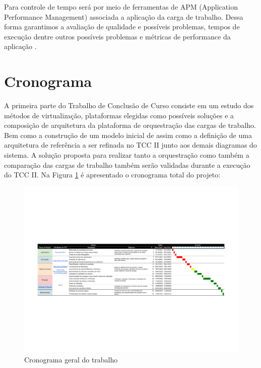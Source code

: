 Para controle de tempo será por meio de ferramentas de APM (Application Performance Management) associada a aplicação da carga de trabalho. Dessa forma garantimos a avaliação de qualidade e possíveis problemas, tempos de execução dentre outros possíveis problemas e métricas de performance da aplicação \cite{tang2021systematical}.


\section{Cronograma}
A primeira parte do Trabalho de Conclusão de Curso consiste em um estudo dos métodos de virtualização, plataformas elegidas como possíveis soluções e a composição de arquitetura da plataforma de orquestração das cargas de trabalho. Bem como a construção de um modelo inicial de assim como a definição de uma arquitetura de referência a ser refinada no TCC II junto aos demais diagramas do sistema. A solução proposta para realizar tanto a orquestração como também a comparação das cargas de trabalho também serão validadas durante a execução do TCC II.
Na Figura \ref{fig:cronograma} é apresentado o cronograma total do projeto:

\begin{landscape}
\begin{figure}[!ht]
    \centering
    \includegraphics[width=\linewidth]{04-figuras/TCC cronograma - Sheet1.pdf}
    \caption{Cronograma geral do trabalho}
    \label{fig:cronograma}
\end{figure}
\end{landscape}